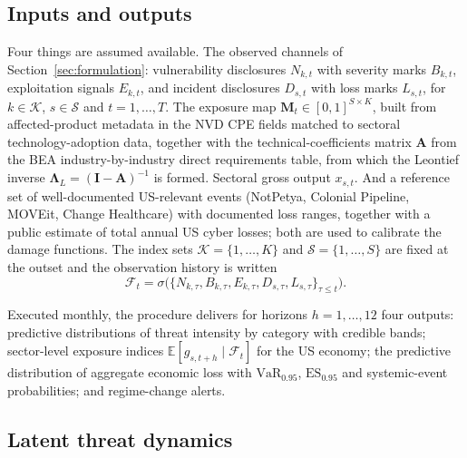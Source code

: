 \documentclass[review]{elsarticle}
\newcommand{\E}{\mathbb{E}}
\begin{document}
\subsection{Inputs and outputs}

Four things are assumed available. The observed channels of Section~\ref{sec:formulation}: vulnerability disclosures $N_{k,t}$ with severity marks $B_{k,t}$, exploitation signals $E_{k,t}$, and incident disclosures $D_{s,t}$ with loss marks $L_{s,t}$, for $k \in \mathcal{K}$, $s \in \mathcal{S}$ and $t = 1, \dots, T$. The exposure map $\bm{M}_t \in [0,1]^{S \times K}$, built from affected-product metadata in the NVD CPE fields matched to sectoral technology-adoption data, together with the technical-coefficients matrix $\bm{A}$ from the BEA industry-by-industry direct requirements table, from which the Leontief inverse $\bm{\Lambda}_L = (\bm{I} - \bm{A})^{-1}$ is formed. Sectoral gross output $x_{s,t}$. And a reference set of well-documented US-relevant events (NotPetya, Colonial Pipeline, MOVEit, Change Healthcare) with documented loss ranges, together with a public estimate of total annual US cyber losses; both are used to calibrate the damage functions. The index sets $\mathcal{K} = \{1,\dots,K\}$ and $\mathcal{S} = \{1,\dots,S\}$ are fixed at the outset and the observation history is written
\[
    \mathcal{F}_t = \sigma\big(\{N_{k,\tau}, B_{k,\tau}, E_{k,\tau}, D_{s,\tau}, L_{s,\tau}\}_{\tau \le t}\big).
\]

Executed monthly, the procedure delivers for horizons $h = 1, \dots, 12$ four outputs: predictive distributions of threat intensity by category with credible bands; sector-level exposure indices $\E[g_{s,t+h} \mid \mathcal{F}_t]$ for the US economy; the predictive distribution of aggregate economic loss with $\mathrm{VaR}_{0.95}$, $\mathrm{ES}_{0.95}$ and systemic-event probabilities; and regime-change alerts.

\subsection{Latent threat dynamics}
\end{document}
